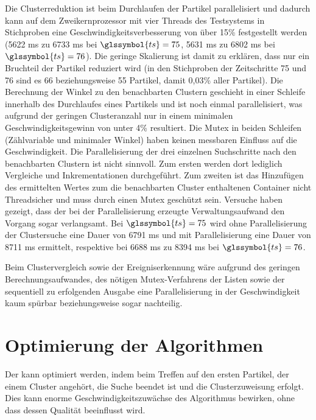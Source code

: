 Die Clusterreduktion ist beim Durchlaufen der Partikel parallelisiert und dadurch kann auf dem Zweikernprozessor mit vier Threads des Testsystems in Stichproben eine Geschwindigkeitsverbesserung von über 15\% festgestellt werden (5622 \gls{ms} zu 6733 \gls{ms} bei $\glssymbol{ts}=75$, 5631 \gls{ms} zu 6802 \gls{ms} bei $\glssymbol{ts}=76$). Die geringe Skalierung ist damit zu erklären, dass nur ein Bruchteil der Partikel reduziert wird (in den Stichproben der Zeitschritte 75 und 76 sind es 66 beziehungsweise 55 Partikel, damit 0,03\% aller Partikel). Die Berechnung der Winkel zu den benachbarten Clustern geschieht in einer Schleife innerhalb des Durchlaufes eines Partikels und ist noch einmal parallelisiert, was aufgrund der geringen Clusteranzahl nur in einem minimalen Geschwindigkeitsgewinn von unter 4\% resultiert. Die Mutex in beiden Schleifen (Zählvariable und minimaler Winkel) haben keinen messbaren Einfluss auf die Geschwindigkeit.
Die Parallelisierung der drei einzelnen Suchschritte nach den benachbarten Clustern ist nicht sinnvoll. Zum ersten werden dort lediglich Vergleiche und Inkrementationen durchgeführt. Zum zweiten ist das Hinzufügen des ermittelten Wertes zum die benachbarten Cluster enthaltenen Container nicht Threadsicher und muss durch einen Mutex geschützt sein. Versuche haben gezeigt, dass der bei der Parallelisierung erzeugte Verwaltungsaufwand den Vorgang sogar verlangsamt. Bei $\glssymbol{ts}=75$ wird ohne Parallelisierung der Clustersuche eine Dauer von 6791 \gls{ms} und mit Parallelisierung eine Dauer von 8711 \gls{ms} ermittelt, respektive bei 6688 \gls{ms} zu 8394 \gls{ms} bei $\glssymbol{ts}=76$.

Beim Clustervergleich sowie der Ereigniserkennung wäre aufgrund des geringen Berechnungsaufwandes, des nötigen Mutex-Verfahrens der Listen sowie der sequentiell zu erfolgenden Ausgabe eine Parallelisierung in der Geschwindigkeit kaum spürbar beziehungsweise sogar nachteilig.



\section{Optimierung der Algorithmen}\label{sec:disc:optimierungAlg}
Der \CFD kann optimiert werden, indem beim Treffen auf den ersten Partikel, der einem Cluster angehört, die Suche beendet ist und die Clusterzuweisung erfolgt. Dies kann enorme Geschwindigkeitszuwächse des Algorithmus bewirken, ohne dass dessen Qualität beeinflusst wird.

